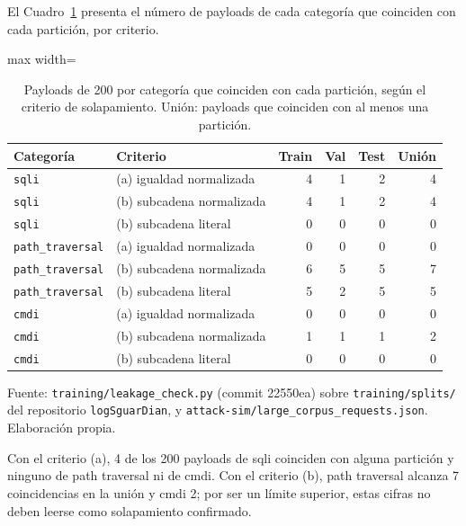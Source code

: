 El Cuadro~\ref{tabla:res-ronda5-solapamiento} presenta el número de payloads de cada categoría que coinciden con cada partición, por criterio.

\begin{table}[htbp]
\centering
\footnotesize
\setlength{\tabcolsep}{3pt}
\begin{adjustbox}{max width=\linewidth}
\begin{tabular}{|l|l|r|r|r|r|}
\hline
\textbf{Categoría} & \textbf{Criterio} & \textbf{Train} & \textbf{Val} & \textbf{Test} & \textbf{Unión} \\ \hline
\texttt{sqli} & (a) igualdad normalizada & 4 & 1 & 2 & 4 \\ \hline
\texttt{sqli} & (b) subcadena normalizada & 4 & 1 & 2 & 4 \\ \hline
\texttt{sqli} & (b) subcadena literal & 0 & 0 & 0 & 0 \\ \hline
\texttt{path\_traversal} & (a) igualdad normalizada & 0 & 0 & 0 & 0 \\ \hline
\texttt{path\_traversal} & (b) subcadena normalizada & 6 & 5 & 5 & 7 \\ \hline
\texttt{path\_traversal} & (b) subcadena literal & 5 & 2 & 5 & 5 \\ \hline
\texttt{cmdi} & (a) igualdad normalizada & 0 & 0 & 0 & 0 \\ \hline
\texttt{cmdi} & (b) subcadena normalizada & 1 & 1 & 1 & 2 \\ \hline
\texttt{cmdi} & (b) subcadena literal & 0 & 0 & 0 & 0 \\ \hline
\end{tabular}
\end{adjustbox}
\caption{Payloads de 200 por categoría que coinciden con cada partición, según el criterio de solapamiento. Unión: payloads que coinciden con al menos una partición.}
\label{tabla:res-ronda5-solapamiento}
\par\smallskip\footnotesize Fuente: \texttt{training/leakage\_check.py} (commit 22550ea) sobre \texttt{training/splits/} del repositorio \texttt{logSguarDian}, y \texttt{attack-sim/large\_corpus\_requests.json}. Elaboración propia.
\end{table}

Con el criterio (a), 4 de los 200 payloads de sqli coinciden con alguna partición y ninguno de path traversal ni de cmdi. Con el criterio (b), path traversal alcanza 7 coincidencias en la unión y cmdi 2; por ser un límite superior, estas cifras no deben leerse como solapamiento confirmado.

